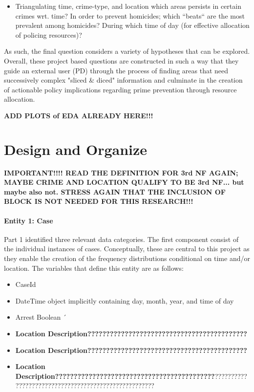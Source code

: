 \documentclass[a4paper]{article}
\begin{document}
\begin{itemize}
  \item Triangulating time, crime-type, and location which areas persists in certain crimes wrt. time?
In order to prevent homicides; which “beats“ are the most prevalent among homicides? During which time of day (for effective allocation of policing resources)? 
\end{itemize}

As such, the final question considers a variety of hypotheses that can be explored. Overall, these project based questions are constructed in such a way that they guide an external user (PD) through the process of finding areas that need successively complex "sliced \& diced" information and culminate in the creation of actionable policy implications regarding prime prevention through resource allocation.


\textbf{ADD PLOTS of EDA ALREADY HERE!!!}


\section{Design and Organize}

\textbf{IMPORTANT!!!! READ THE DEFINITION FOR 3rd NF AGAIN; MAYBE CRIME AND LOCATION QUALIFY TO BE 3rd NF... but maybe also not. STRESS AGAIN THAT THE INCLUSION OF BLOCK IS NOT NEEDED FOR THIS RESEARCH!!!}

\paragraph{Entity 1: Case} Part 1 identified three relevant data categories.  The first component consist of the individual instances of cases. Conceptually, these are central to this project as they enable the creation of the frequency distributions conditional on time and/or location. The variables that define this entity are as follows:

\begin{itemize}
  \item CaseId
  \item DateTime object implicitly containing day, month, year, and time of day 
  \item Arrest Boolean  
´  \item \textbf{Location Description???????????????????????????????????????????}
\item \textbf{Location Description???????????????????????????????????????????}
\item \textbf{Location Description???????????????????????????????????????????}?????????????????????????????????????????????????????
\end{itemize}
 
\end{document}
